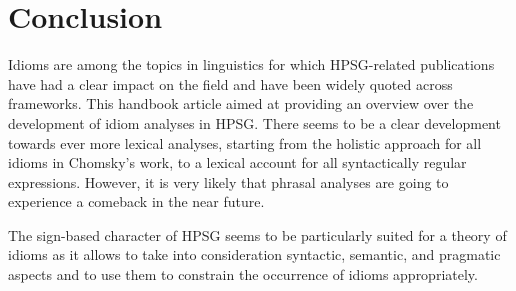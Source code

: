 \documentclass[output=paper]{langsci/langscibook}
\begin{document}


\section{Conclusion}
\label{Sec-Summary}

Idioms are among the topics in linguistics for which HPSG-related publications have had a clear impact on the field and have been widely quoted across frameworks.
This handbook article aimed at providing an overview over the development of idiom analyses in HPSG. There seems to be a clear development towards ever more lexical analyses, starting from the holistic approach for all idioms in Chomsky's work, to a lexical account for all syntactically regular expressions. 
However, it is very likely that phrasal analyses are going to experience a comeback in the near future. 

The sign-based character of HPSG seems to be particularly suited for a theory of idioms as it allows to take into consideration syntactic, semantic, and pragmatic aspects and to use them to constrain the occurrence of idioms appropriately.
\end{document}
